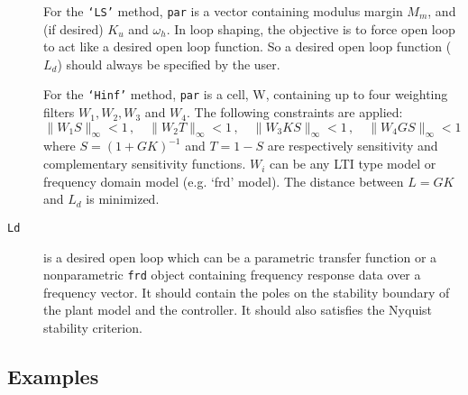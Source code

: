 \documentclass [12pt , a4paper] {report}
\begin{document}
\begin{description}
 For the {\tt `LS'} method, \texttt{par} is a vector containing modulus margin $M_m$, and (if desired) $K_u$ and $\omega_h$. In loop shaping, the objective is to force open loop to act like a desired open loop function. So a desired open loop function ($L_d$) should always be specified by the user.    
     
             
For the {\tt `Hinf'} method, {\tt par} is a cell, W, containing up to four weighting
filters $W_{1}, W_{2}, W_{3}$ and $W_{4}$. The following constraints are applied:
 $$
 \|W_1S\|_\infty<1 \, , \quad
 \|W_2T\|_\infty<1 \, , \quad
 \|W_3KS\|_\infty<1  \, , \quad
 \|W_4GS\|_\infty<1 
$$
       where $S=(1+GK)^{-1}$ and $T=1-S$ are respectively sensitivity and complementary 
       sensitivity functions. $W_{i}$ can be any LTI type model or frequency domain model 
       (e.g. `frd' model). The distance between $L=GK$ and $L_d$ is minimized.


\item[\texttt{Ld}] is a desired open loop which can be a parametric transfer function or a nonparametric \texttt{frd} object containing frequency response data over a frequency vector. It should contain the
     poles on the stability boundary of the plant model and the controller. It should also 
     satisfies the Nyquist stability criterion.



\end{description}

\subsection{Examples}
\end{document}
